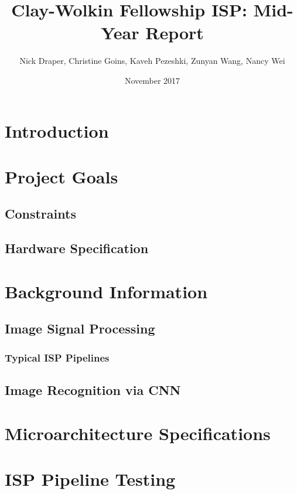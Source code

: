 \documentclass{report}
\begin{document}
\title{Clay-Wolkin Fellowship ISP: Mid-Year Report}
\author{Nick Draper, Christine Goins, Kaveh Pezeshki, Zunyan Wang, Nancy Wei}
\date{November 2017}
\maketitle

\tableofcontents
\listoffigures
\listoftables

\begin{abstract}
	\label{abstract}
\end{abstract}

\chapter{Introduction}

\chapter{Project Goals}
	\section{Constraints}
	\section{Hardware Specification}

\chapter{Background Information}
	\section{Image Signal Processing}
		\subsection{Typical ISP Pipelines}
	\section{Image Recognition via CNN}
	
\chapter{Microarchitecture Specifications}

\chapter{ISP Pipeline Testing}
\end{document}
